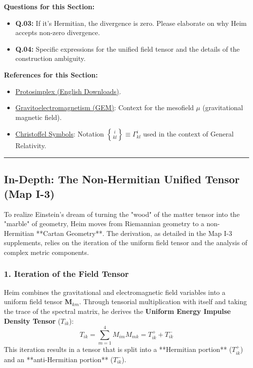 \documentclass[11pt,a4paper,oneside]{article}
\newenvironment{sectionrefs}
  {\par\vspace{1em}\noindent\textbf{\textsf{References for this Section:}}\begin{itemize}[leftmargin=*, label={\scriptsize$\blacksquare$}, itemsep=2pt]}
  {\end{itemize}}
\newcommand{\hr}{\par\vspace{2em}\noindent\rule{\linewidth}{0.4pt}\par\vspace{2em}}
\begin{document}
\textbf{Questions for this Section:}
\begin{itemize}
    \item[\fbox{?}] \textbf{Q.03:} If it's Hermitian, the divergence is zero. Please elaborate on why Heim accepts non-zero divergence.
    \item[\fbox{?}] \textbf{Q.04:} Specific expressions for the unified field tensor and the details of the construction ambiguity.
\end{itemize}

\begin{sectionrefs}
    \item \href{https://www.engon.de/protosimplex/index_e.htm}{Protosimplex (English Downloads)}.
    \item \href{https://en.wikipedia.org/wiki/Gravitoelectromagnetism}{Gravitoelectromagnetism (GEM)}: Context for the mesofield $\mu$ (gravitational magnetic field).
    \item \href{https://en.wikipedia.org/wiki/Christoffel_symbols}{Christoffel Symbols}: Notation $\genfrac{\{}{\}}{0pt}{}{i}{kl} \equiv \Gamma^{i}_{kl}$ used in the context of General Relativity.
\end{sectionrefs}

\hr

\subsection*{In-Depth: The Non-Hermitian Unified Tensor (Map I-3)}

To realize Einstein's dream of turning the "wood" of the matter tensor into the "marble" of geometry, Heim moves from Riemannian geometry to a non-Hermitian **Cartan Geometry**. The derivation, as detailed in the Map I-3 supplements, relies on the iteration of the uniform field tensor and the analysis of complex metric components.

\subsubsection*{1. Iteration of the Field Tensor}
Heim combines the gravitational and electromagnetic field variables into a uniform field tensor $\mathbf{M}_{km}$. Through tensorial multiplication with itself and taking the trace of the spectral matrix, he derives the \textbf{Uniform Energy Impulse Density Tensor} ($T_{ik}$):
\begin{equation}
    T_{ik} = \sum_{m=1}^4 M_{im} M_{mk} = T_{ik}^+ + T_{ik}^-
\tag{I-3.1}
\end{equation}
This iteration results in a tensor that is split into a **Hermitian portion** ($T_{ik}^+$) and an **anti-Hermitian portion** ($T_{ik}^-$).
\end{document}
